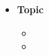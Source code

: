 \begin{itemize}
	\item \textbf{Topic}
	      \begin{itemize}[label=]
		      \item \lipsum[1-1]
		      \item \lipsum[2-2]
	      \end{itemize}
\end{itemize}
